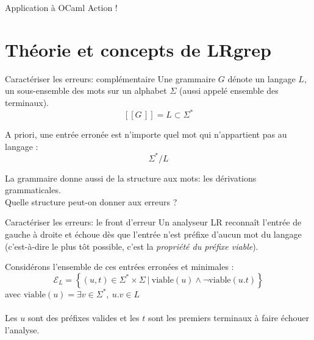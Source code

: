 \documentclass{beamer}          %
\begin{document}
\begin{frame}{Application à OCaml}
  Action !
\end{frame}

\section{Théorie et concepts de LRgrep}

\begin{frame}{Caractériser les erreurs: complémentaire}
  Une grammaire $G$ dénote un langage $L$, un sous-ensemble des mots sur un alphabet $\Sigma$ (aussi appelé ensemble des terminaux).
  $$
  [\![G\,]\!] = L \subset \Sigma^*
  $$

  \pause
  A priori, une entrée erronée est n'importe quel mot qui n'appartient pas au langage :
  $$
  \Sigma^* / L
  $$

  \pause
  La grammaire donne aussi de la structure aux mots: les dérivations grammaticales.
  \\
  Quelle structure peut-on donner aux erreurs ?
\end{frame}

\begin{frame}{Caractériser les erreurs: le front d'erreur}
  Un analyseur LR reconnaît l'entrée de gauche à droite et échoue dès que l'entrée n'est préfixe d'aucun mot du langage (c'est-à-dire le plus tôt possible, c'est la {\em propriété du préfixe viable}).


  \pause
  Considérons l'ensemble de ces entrées erronées et minimales :
  $$
  \mathcal E_L = \left\{ (u, t) \in \Sigma^*\times\Sigma\ \big|\
    \text{viable}(u) \wedge \neg \text{viable}(u.t)
  \right\}
  $$
  \qquad avec $\text{viable}(u) = \exists v \in \Sigma^*,\ u.v \in L$
  \pause
  \\ \ \\
  Les $u$ sont des préfixes valides et les $t$ sont les premiers terminaux
  à faire échouer l'analyse.

\end{frame}

\end{document}

